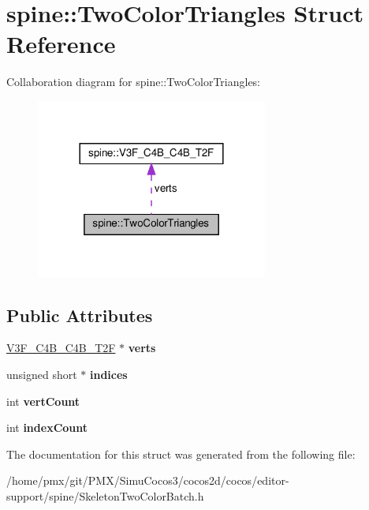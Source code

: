 \hypertarget{structspine_1_1TwoColorTriangles}{}\section{spine\+:\+:Two\+Color\+Triangles Struct Reference}
\label{structspine_1_1TwoColorTriangles}


Collaboration diagram for spine\+:\+:Two\+Color\+Triangles\+:
\nopagebreak
\begin{figure}[H]
\begin{center}
\leavevmode
\includegraphics[width=216pt]{structspine_1_1TwoColorTriangles__coll__graph}
\end{center}
\end{figure}
\subsection*{Public Attributes}
\begin{DoxyCompactItemize}
\item 
\mbox{\label{structspine_1_1TwoColorTriangles_afcfb3ff43c55265b3fc79a0041c875fc}} 
\hyperlink{structspine_1_1V3F__C4B__C4B__T2F}{V3\+F\+\_\+\+C4\+B\+\_\+\+C4\+B\+\_\+\+T2F} $\ast$ {\bfseries verts}
\item 
\mbox{\label{structspine_1_1TwoColorTriangles_a6cf0871d9d315a9f6b2b56bb3fef7465}} 
unsigned short $\ast$ {\bfseries indices}
\item 
\mbox{\label{structspine_1_1TwoColorTriangles_ab7e7fca4500482417806d43af252fb48}} 
int {\bfseries vert\+Count}
\item 
\mbox{\label{structspine_1_1TwoColorTriangles_ad1d131feb34da3ca2f4ad48de7e242d8}} 
int {\bfseries index\+Count}
\end{DoxyCompactItemize}


The documentation for this struct was generated from the following file\+:\begin{DoxyCompactItemize}
\item 
/home/pmx/git/\+P\+M\+X/\+Simu\+Cocos3/cocos2d/cocos/editor-\/support/spine/Skeleton\+Two\+Color\+Batch.\+h\end{DoxyCompactItemize}
